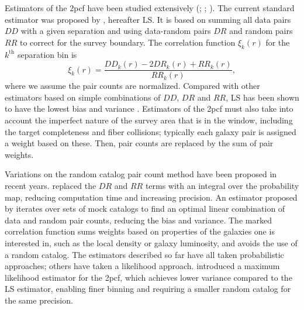 \documentclass[modern]{aastex62}
\newcommand{\cf}{2pcf\xspace} %
\newcommand{\LS}{LS\xspace}
\begin{document}
Estimators of the \cf have been studied extensively (\citealt{PeeblesHauser1974}; \citealt{DavisPeebles1983}; \citealt{Hamilton1993}).
The current standard estimator was proposed by \cite{LandySzalay1993}, hereafter \LS. It is based on summing all data pairs $DD$ with a given separation and using data-random pairs $DR$ and random pairs $RR$ to correct for the survey boundary. The correlation function $\xi_k(r)$ for the $k^\mathrm{th}$ separation bin is
\begin{equation}
\xi_k(r) = \frac{DD_k(r) - 2DR_k(r) + RR_k(r)}{RR_k(r)},
\end{equation}
where we assume the pair counts are normalized. %
Compared with other estimators based on simple combinations of $DD$, $DR$ and $RR$, \LS has been shown to have the lowest bias and variance \citep{Kerscher2000}. %
Estimators of the \cf must also take into account the imperfect nature of the survey area that is in the window, including the target completeness and fiber collisions; typically each galaxy pair is assigned a weight based on these. %
Then, pair counts are replaced by the sum of pair weights.

Variations on the random catalog pair count method have been proposed in recent years.
\cite{Demina2016} replaced the $DR$ and $RR$ terms with an integral over the probability map, reducing computation time and increasing precision.
An estimator proposed by \cite{VargasMagana2013} iterates over sets of mock catalogs to find an optimal linear combination of data and random pair counts, reducing the bias and variance.
The marked correlation function \citep{WhitePadmanabhan2009} sums weights based on properties of the galaxies one is interested in, such as the local density or galaxy luminosity, and avoids the use of a random catalog.
The estimators described so far have all taken probabilistic approaches; others have taken a likelihood approach.
\cite{BaxterRozo2013} introduced a maximum likelihood estimator for the \cf, which achieves lower variance compared to the \LS estimator, enabling finer binning and requiring a smaller random catalog for the same precision.
\end{document}
